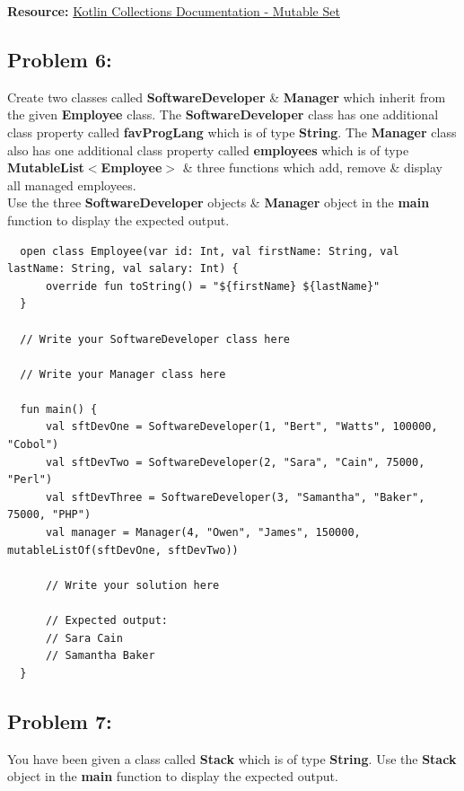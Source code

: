 \documentclass{article}
\begin{document}
\textbf{Resource:} \href{https://kotlinlang.org/api/latest/jvm/stdlib/kotlin.collections/-mutable-set/}{Kotlin Collections Documentation - Mutable Set}

\subsection*{Problem 6:} 
Create two classes called \textbf{SoftwareDeveloper} \& \textbf{Manager} which inherit from the given \textbf{Employee} class. The \textbf{SoftwareDeveloper} class has one additional class property called \textbf{favProgLang} which is of type \textbf{String}. The \textbf{Manager} class also has one additional class property called \textbf{employees} which is of type \textbf{MutableList$<$Employee$>$} \& three functions which add, remove \& display all managed employees. \\

Use the three \textbf{SoftwareDeveloper} objects \& \textbf{Manager} object in the \textbf{main} function to display the expected output.

\begin{verbatim}
  open class Employee(var id: Int, val firstName: String, val lastName: String, val salary: Int) {
      override fun toString() = "${firstName} ${lastName}"
  }

  // Write your SoftwareDeveloper class here

  // Write your Manager class here

  fun main() {
      val sftDevOne = SoftwareDeveloper(1, "Bert", "Watts", 100000, "Cobol")
      val sftDevTwo = SoftwareDeveloper(2, "Sara", "Cain", 75000, "Perl")
      val sftDevThree = SoftwareDeveloper(3, "Samantha", "Baker", 75000, "PHP")
      val manager = Manager(4, "Owen", "James", 150000, mutableListOf(sftDevOne, sftDevTwo))

      // Write your solution here

      // Expected output:
      // Sara Cain
      // Samantha Baker
  }
\end{verbatim}

\subsection*{Problem 7:}
You have been given a class called \textbf{Stack} which is of type \textbf{String}. Use the \textbf{Stack} object in the \textbf{main} function to display the expected output.
\end{document}
